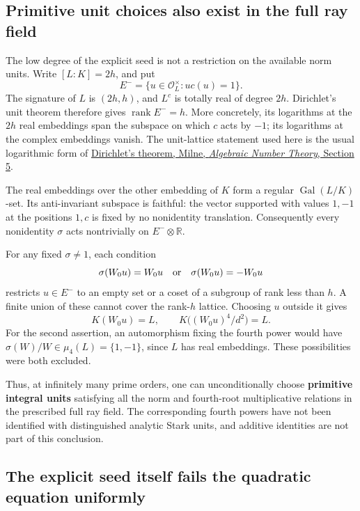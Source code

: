 \documentclass[11pt,reqno]{amsart}
\theoremstyle{plain}
\begin{document}
\subsection{Primitive unit choices also exist in the full ray field}\label{sec:48.2}

The low degree of the explicit seed is not a restriction on the
available norm units. Write \([L:K]=2h\), and put
\[
 E^-=\{u\in\mathcal O_L^\times:u c(u)=1\}.
\]
The signature of \(L\) is \((2h,h)\), and \(L^c\) is totally
real of degree \(2h\). Dirichlet's unit theorem therefore gives
\(\operatorname{rank}E^-=h\). More concretely, its logarithms at
the \(2h\) real embeddings span the subspace on which \(c\)
acts by \(-1\); its logarithms at the complex embeddings vanish.
The unit-lattice statement used here is the usual logarithmic form
of \href{https://www.jmilne.org/math/CourseNotes/ANTc.pdf}{Dirichlet's theorem, Milne, \emph{Algebraic Number Theory}, Section 5}.

The real embeddings over the other embedding of \(K\) form a
regular \(\operatorname{Gal}(L/K)\)-set. Its anti-invariant
subspace is faithful: the vector supported with values \(1,-1\)
at the positions \(1,c\) is fixed by no nonidentity translation.
Consequently every nonidentity \(\sigma\) acts nontrivially on
\(E^-\otimes\mathbb R\).

For any fixed \(\sigma\ne1\), each condition
\[
 \sigma(W_0u)=W_0u \quad\hbox{or}\quad
 \sigma(W_0u)=-W_0u
\]
restricts \(u\in E^-\) to an empty set or a coset of a subgroup
of rank less than \(h\). A finite union of these cannot cover the
rank-\(h\) lattice. Choosing \(u\) outside it gives
\begin{equation*}
 K(W_0u)=L,
 \qquad K\bigl((W_0u)^4/d^2\bigr)=L. \tag{48.2}
\end{equation*}
For the second assertion, an automorphism fixing the fourth power
would have \(\sigma(W)/W\in\mu_4(L)=\{1,-1\}\), since \(L\)
has real embeddings. These possibilities were both excluded.

Thus, at infinitely many prime orders, one can unconditionally
choose \textbf{primitive integral units} satisfying all the norm and
fourth-root multiplicative relations in the prescribed full ray
field. The corresponding fourth powers have not been identified
with distinguished analytic Stark units, and additive identities
are not part of this conclusion.

\subsection{The explicit seed itself fails the quadratic equation uniformly}\label{sec:48.3}
\end{document}
